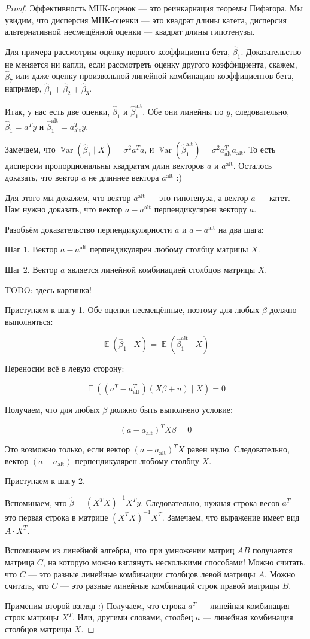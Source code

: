 \documentclass[12pt]{article}
\DeclareMathOperator{\Var}{\mathbb{V}ar}
\DeclareMathOperator{\E}{\mathbb{E}}
\newcommand{\hb}{\hat{\beta}}
\newcommand{\alt}{\text{alt}}
\begin{document}
\begin{proof}
Эффективность МНК-оценок — это реинкарнация теоремы Пифагора. 
Мы увидим, что дисперсия МНК-оценки — это квадрат длины катета, 
дисперсия альтернативной несмещённой оценки — квадрат длины гипотенузы.

Для примера рассмотрим оценку первого коэффициента бета, $\hb_1$.
Доказательство не меняется ни капли, если рассмотреть оценку другого коэффициента, скажем, $\hb_7$ или даже оценку произвольной линейной комбинацию коэффициентов бета, например, $\hb_1 + \hb_2 + \hb_3$.

Итак, у нас есть две оценки, $\hat\beta_1$ и $\hat\beta_1^{\alt}$. 
Обе они линейны по $y$, следовательно, $\hat\beta_1 = a^T y$ и $\hat\beta_1^{\alt} = a^T_{\alt} y$.


Замечаем, что $\Var(\hat\beta_1 \mid X) = \sigma^2 a^Ta$, и $\Var(\hat\beta_1^{\alt}) = \sigma^2 a_{\alt}^Ta_{\alt}$. 
То есть дисперсии пропорциональны квадратам длин векторов $a$ и $a^{\alt}$. 
Осталось доказать, что вектор $a$ не длиннее вектора $a^{\alt}$ :)

Для этого мы докажем, что вектор $a^{\alt}$ — это гипотенуза, а вектор $a$ — катет. 
Нам нужно доказать, что вектор $a - a^{\alt}$ перпендикулярен вектору $a$.

Разобъём доказательство перпендикулярности $a$ и $a-a^{\alt}$ на два шага:

Шаг 1. Вектор $a - a^{\alt}$ перпендикулярен любому столбцу матрицы $X$.

Шаг 2. Вектор $a$ является линейной комбинацией столбцов матрицы $X$.


TODO: здесь картинка!


Приступаем к шагу 1. Обе оценки несмещённые, поэтому для любых $\beta$ должно выполняться:

\[
\E(\hat\beta_1 \mid X) = \E(\hat\beta_1^{\alt} \mid X)
\]

Переносим всё в левую сторону:

\[
\E((a^T - a^T_{\alt})(X\beta + u) \mid X) = 0
\]

Получаем, что для любых $\beta$ должно быть выполнено условие:

\[
(a - a_{\alt})^T X\beta = 0
\]

Это возможно только, если вектор $(a - a_{\alt})^T X$ равен нулю. 
Следовательно, вектор $(a - a_{\alt})$ перпендикулярен любому столбцу $X$.


Приступаем к шагу 2.

Вспоминаем, что $\hat \beta = (X^T X)^{-1}X^T y$. Следовательно, нужная строка весов $a^T$ — 
это первая строка в матрице $(X^TX)^{-1}X^T$. 
Замечаем, что выражение имеет вид $A \cdot X^T$. 

Вспоминаем из линейной алгебры, что при умножении матриц $AB$ получается матрица $C$, 
на которую можно взглянуть несколькими способами!
Можно считать, что $C$ — это разные линейные комбинации столбцов левой матрицы $A$. 
Можно считать, что $C$ — это разные линейные комбинаций строк правой матрицы $B$.

Применим второй взгляд :) Получаем, что строка $a^T$ — линейная комбинация строк матрицы $X^T$. 
Или, другими словами, столбец $a$ — линейная комбинация столбцов матрицы $X$.
\end{proof}
\end{document}
